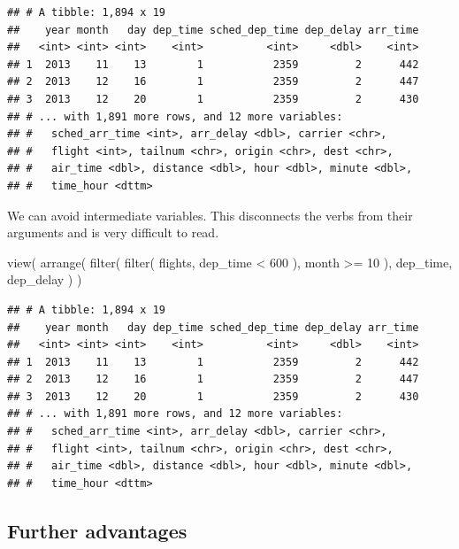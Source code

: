 \documentclass[]{book}
\newenvironment{Shaded}{}{}
\newcommand{\DecValTok}[1]{#1}
\newcommand{\KeywordTok}[1]{\textcolor[rgb]{0.00,0.00,1.00}{#1}}
\newcommand{\NormalTok}[1]{#1}
\newcommand{\OperatorTok}[1]{#1}
\newcommand{\StringTok}[1]{\textcolor[rgb]{0.00,0.50,0.50}{#1}}
\begin{document}
\begin{verbatim}
## # A tibble: 1,894 x 19
##    year month   day dep_time sched_dep_time dep_delay arr_time
##   <int> <int> <int>    <int>          <int>     <dbl>    <int>
## 1  2013    11    13        1           2359         2      442
## 2  2013    12    16        1           2359         2      447
## 3  2013    12    20        1           2359         2      430
## # ... with 1,891 more rows, and 12 more variables:
## #   sched_arr_time <int>, arr_delay <dbl>, carrier <chr>,
## #   flight <int>, tailnum <chr>, origin <chr>, dest <chr>,
## #   air_time <dbl>, distance <dbl>, hour <dbl>, minute <dbl>,
## #   time_hour <dttm>
\end{verbatim}

We can avoid intermediate variables.
This disconnects the verbs from their arguments and is very difficult to read.

\begin{Shaded}
\begin{Highlighting}[]
\KeywordTok{view}\NormalTok{(}
  \KeywordTok{arrange}\NormalTok{(}
    \KeywordTok{filter}\NormalTok{(}
      \KeywordTok{filter}\NormalTok{(}
\NormalTok{        flights,}
\NormalTok{        dep_time }\OperatorTok{<}\StringTok{ }\DecValTok{600}
\NormalTok{      ),}
\NormalTok{      month }\OperatorTok{>=}\StringTok{ }\DecValTok{10}
\NormalTok{    ),}
\NormalTok{    dep_time, dep_delay}
\NormalTok{  )}
\NormalTok{)}
\end{Highlighting}
\end{Shaded}

\begin{verbatim}
## # A tibble: 1,894 x 19
##    year month   day dep_time sched_dep_time dep_delay arr_time
##   <int> <int> <int>    <int>          <int>     <dbl>    <int>
## 1  2013    11    13        1           2359         2      442
## 2  2013    12    16        1           2359         2      447
## 3  2013    12    20        1           2359         2      430
## # ... with 1,891 more rows, and 12 more variables:
## #   sched_arr_time <int>, arr_delay <dbl>, carrier <chr>,
## #   flight <int>, tailnum <chr>, origin <chr>, dest <chr>,
## #   air_time <dbl>, distance <dbl>, hour <dbl>, minute <dbl>,
## #   time_hour <dttm>
\end{verbatim}

\hypertarget{further-advantages}{%
\subsection{Further advantages}\label{further-advantages}}
\end{document}
